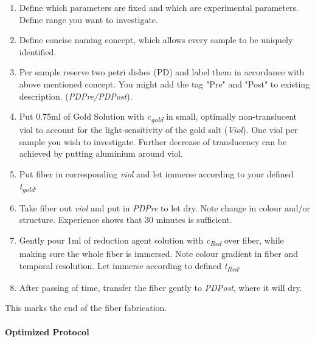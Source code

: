 \begin{enumerate}
    \item Define which parameters are fixed and which are experimental parameters. Define range you want to investigate.
    
    \item Define concise naming concept, which allows every sample to be uniquely identified.
    
    \item Per sample reserve two petri dishes (PD) and label them in accordance with above mentioned concept. You might add the tag "Pre" and "Post" to existing description. (\textit{PDPre/PDPost}).
    
    \item Put 0.75ml of Gold Solution with \textit{c\textsubscript{gold}} in small, optimally non-translucent viol to account for the light-sensitivity of the gold salt (\textit{Viol}). One viol per sample you wish to investigate. Further decrease of translucency can be achieved by putting aluminium around viol.
    
    \item Put fiber in corresponding \textit{viol} and let immerse according to your defined \textit{t\textsubscript{gold}}.
    \item Take fiber out \textit{viol} and put in \textit{PDPre} to let dry. Note change in colour and/or structure. Experience shows that 30 minutes is sufficient.
    
    \item Gently pour 1ml of reduction agent solution with \textit{c\textsubscript{Red}} over fiber, while making sure the whole fiber is immersed. Note colour gradient in fiber and temporal resolution. Let immerse according to defined \textit{t\textsubscript{Red}}.
    
    \item After passing of time, transfer the fiber gently to \textit{PDPost}, where it will dry.
    \end{enumerate}
    
    \begin{center}
        This marks the end of the fiber fabrication.
    \end{center}


\paragraph{Optimized Protocol} \hfill\newline

